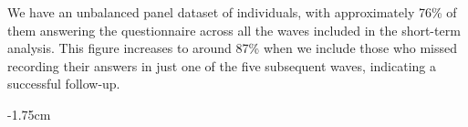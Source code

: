 \documentclass[arguments, manuscript, 11pt]{aastex631}
\begin{document}
We have an unbalanced panel dataset of individuals, with approximately 76\% of them answering the questionnaire across all the waves included in the short-term analysis. This figure increases to around 87\% when we include those who missed recording their answers in just one of the five subsequent waves, indicating a successful follow-up.

\begin{table}[h]
\begin{adjustwidth}{-1.75cm}{}
\centering
\caption{Unbalanced panel observation (short-term analysis (2004-2013)}
\label{tabA4}
\end{adjustwidth}
\end{table}
\end{document}

